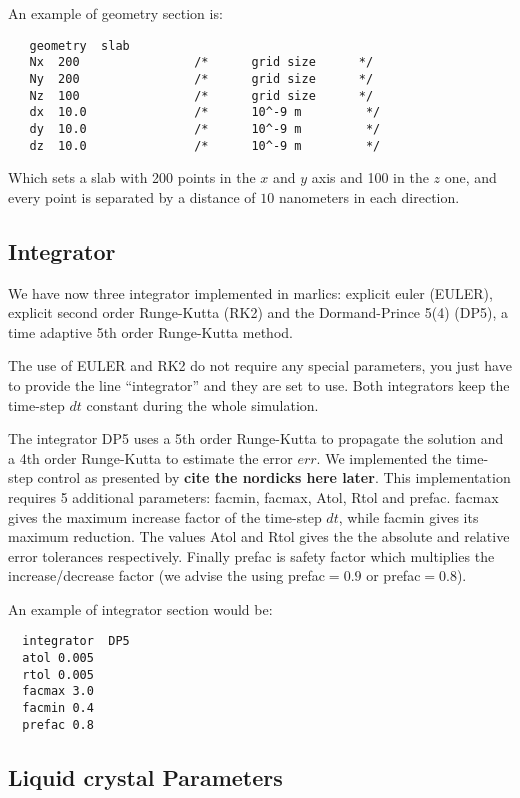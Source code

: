 \documentclass{article}
\begin{document}
An example of geometry section is:

\begin{lstlisting}	
   geometry  slab
   Nx  200                /*      grid size      */
   Ny  200                /*      grid size      */
   Nz  100                /*      grid size      */
   dx  10.0               /*      10^-9 m         */
   dy  10.0               /*      10^-9 m         */
   dz  10.0               /*      10^-9 m         */
\end{lstlisting}

Which sets a slab with 200 points in the $x$ and $y$ axis and 100 in the $z$ one, and every point is separated by a distance of $10$ nanometers in each direction.

\subsection{Integrator}\label{integrator.param}

We have now  three integrator implemented in marlics: explicit euler (EULER), explicit second order Runge-Kutta (RK2) and the Dormand-Prince 5(4) (DP5), a time adaptive 5th order Runge-Kutta method.

The use of EULER and RK2 do not require any special parameters, you
just have to provide the line ``integrator'' and they are set to
use. Both integrators keep the time-step $dt$ constant during the
whole simulation.

The integrator DP5 uses a 5th order Runge-Kutta to propagate the
solution and a 4th order Runge-Kutta to estimate the error $err$. We
implemented the time-step control as presented by \textbf{cite the
  nordicks here later}. This implementation requires 5 additional
parameters: facmin, facmax, Atol, Rtol and prefac. facmax gives the
maximum increase factor of the time-step $dt$, while facmin gives its
maximum reduction. The values Atol and Rtol gives the the absolute and
relative error tolerances respectively. Finally prefac is safety
factor which multiplies the increase/decrease factor (we advise the
using prefac$=0.9$ or prefac$=0.8$).

 An example of integrator section would be:
\begin{lstlisting}
  integrator  DP5
  atol 0.005
  rtol 0.005
  facmax 3.0
  facmin 0.4
  prefac 0.8
\end{lstlisting}

\subsection{Liquid crystal Parameters}\label{lc.param}
\end{document}

